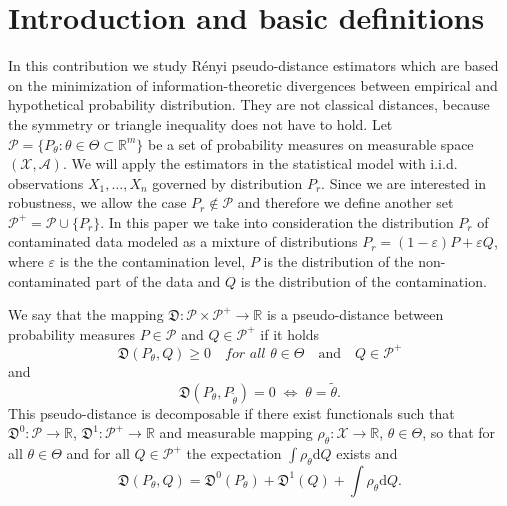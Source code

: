 
{\normalsize


\section{Introduction and basic definitions}
In this contribution we study R\'{e}nyi pseudo-distance estimators which are based on the minimization of information-theoretic divergences between empirical and hypothetical probability distribution. They are not classical distances, because the symmetry or triangle inequality does not have to hold. Let $\mathcal{P} = \lbrace P_\theta : \theta \in \Theta \subset \mathbb{R}^m \rbrace$ be a set of probability measures on measurable space $\left(\mathcal{X},\mathcal{A}\right)$.
We will apply the estimators in the statistical model with i.i.d. observations $X_1,\ldots,X_n$ governed by distribution $P_r$.
Since we are interested in robustness, we allow the case $P_r \notin \mathcal{P}$ and therefore we define another set $\mathcal{P}^+ = \mathcal{P} \cup \lbrace P_r \rbrace $. In this paper we take into consideration the distribution $P_r$ of contaminated data modeled as a mixture of distributions $P_r = (1-\varepsilon)P + \varepsilon Q$, where $\varepsilon$ is the the contamination level, $P$ is the distribution of the non-contaminated part of the data and $Q$ is the distribution of the contamination.

\begin{definition}
	We say that the mapping $\mathfrak{D}:\mathcal{P}\times\mathcal{P}^+ \rightarrow \mathbb{R}$ is a pseudo-distance between probability measures $P \in \mathcal{P}$ and $Q \in \mathcal{P}^+$ if it holds		
		\begin{equation}
			\mathfrak{D}(P_\theta,Q) \geq 0 \quad \textit{for all } \theta \in \Theta \quad \text{and} \quad Q \in \mathcal{P}^+
		\end{equation}
		and 		
		\begin{equation}
			\mathfrak{D}(P_\theta,P_{\tilde{\theta}})=0 \; \Leftrightarrow \; \theta=\tilde{\theta}.
		\end{equation}	
	This pseudo-distance is decomposable if there exist functionals such that
		 $\mathfrak{D}^0:\mathcal{P}\rightarrow\mathbb{R}$, $ \mathfrak{D}^1:\mathcal{P}^+ \rightarrow \mathbb{R}$ and measurable mapping
		  $\rho_\theta : \mathcal{X} \rightarrow \mathbb{R}$, $ \theta \in \Theta$, so that for all $\theta \in \Theta$ and for all $Q \in \mathcal{P}^+$ the expectation $\int{\rho_\theta }\mathrm{d}Q$ exists and
		\begin{equation}
			\mathfrak{D} (P_\theta, Q) = \mathfrak{D}^0 (P_\theta) + \mathfrak{D}^1 (Q) + \int \rho_\theta \mathrm{d}Q.
		\end{equation}
\end{definition}

}

